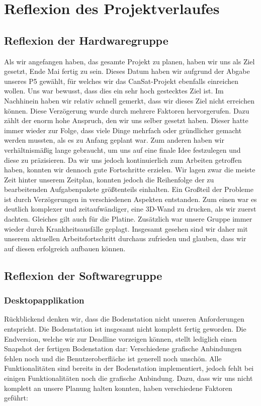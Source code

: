 \section{Reflexion des Projektverlaufes}
\subsection{Reflexion der Hardwaregruppe}
Als wir angefangen haben, das gesamte Projekt zu planen, haben wir uns als Ziel gesetzt, Ende Mai fertig zu sein. Dieses Datum haben wir aufgrund der Abgabe unseres P5 gewählt, für welches wir das CanSat-Projekt ebenfalls einreichen wollen. Uns war bewusst, dass dies ein sehr hoch gestecktes Ziel ist. Im Nachhinein haben wir relativ schnell gemerkt, dass wir dieses Ziel nicht erreichen können. Diese Verzögerung wurde durch mehrere Faktoren hervorgerufen. Dazu zählt der enorm hohe Anspruch, den wir uns selber gesetzt haben. Dieser hatte immer wieder zur Folge, dass viele Dinge mehrfach oder gründlicher gemacht werden mussten, als es zu Anfang geplant war. Zum anderen haben wir verhältnismäßig lange gebraucht, um uns auf eine finale Idee festzulegen und diese zu präzisieren. Da wir uns jedoch kontinuierlich zum Arbeiten getroffen haben, konnten wir dennoch gute Fortschritte erzielen. Wir lagen zwar die meiste Zeit hinter unserem Zeitplan, konnten jedoch die Reihenfolge der zu bearbeitenden Aufgabenpakete größtenteils einhalten. Ein Großteil der Probleme ist durch Verzögerungen in verschiedenen Aspekten entstanden.  Zum einen war es deutlich komplexer und zeitaufwändiger, eine 3D-Wand zu drucken, als wir zuerst dachten. Gleiches gilt auch für die Platine. Zusätzlich war unsere Gruppe immer wieder durch Krankheitsausfälle geplagt. Insgesamt gesehen sind wir daher mit unserem aktuellen Arbeitsfortschritt durchaus zufrieden und glauben, dass wir auf diesen erfolgreich aufbauen können.

\subsection{Reflexion der Softwaregruppe}
\subsubsection{Desktopapplikation}
Rückblickend denken wir, dass die Bodenstation nicht unseren Anforderungen entspricht. Die Bodenstation ist insgesamt nicht komplett fertig geworden. Die Endversion, welche wir zur Deadline vorzeigen können, stellt lediglich einen Snapshot der fertigen Bodenstation dar: Verschiedene grafische Anbindungen fehlen noch und die Benutzeroberfläche ist generell noch unschön. Alle Funktionalitäten sind bereits in der Bodenstation implementiert, jedoch fehlt bei einigen Funktionalitäten noch die grafische Anbindung. Dazu, dass wir uns nicht komplett an unsere Planung halten konnten, haben verschiedene Faktoren geführt:

